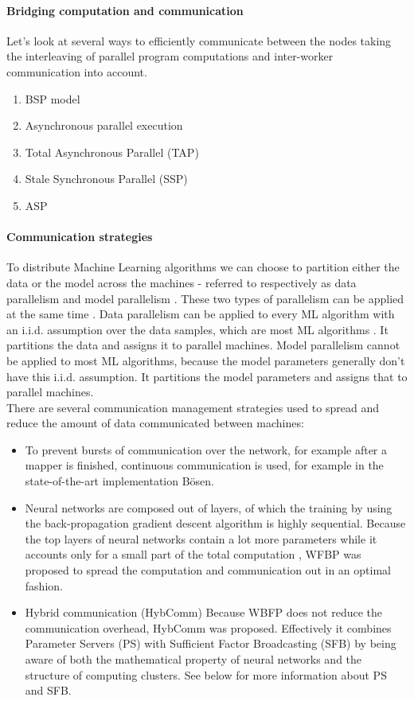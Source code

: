 \paragraph{Bridging computation and communication}
Let's look at several ways to efficiently communicate between the nodes taking the interleaving of parallel program computations and inter-worker communication into account.
\begin{enumerate}
	\item BSP model
	\item Asynchronous parallel execution
	\item Total Asynchronous Parallel (TAP)
	\item Stale Synchronous Parallel (SSP)
	\item ASP
\end{enumerate}


\paragraph{Communication strategies}
To distribute Machine Learning algorithms we can choose to partition either the data or the model across the machines - referred to respectively as data parallelism and model parallelism \cite{Die12}. These two types of parallelism can be applied at the same time \cite{Xing16}. Data parallelism can be applied to every ML algorithm with an i.i.d. assumption over the data samples, which are most ML algorithms \cite{Xing16}. It partitions the data and assigns it to parallel machines. Model parallelism cannot be applied to most ML algorithms, because the model parameters generally don't have this i.i.d. assumption. It partitions the model parameters and assigns that to parallel machines.\\
There are several communication management strategies\cite{Xing16} used to spread and reduce the amount of data communicated between machines:
\begin{itemize}
	\item To prevent bursts of communication over the network, for example after a mapper is finished, continuous communication is used, for example in the state-of-the-art implementation Bösen\cite{Wei15}.
	
	\item Neural networks are composed out of layers, of which the training by using the back-propagation gradient descent algorithm is highly sequential. Because the top layers of neural networks contain a lot more parameters while it accounts only for a small part of the total computation \cite{Xing16}, WFBP \cite{Zhang17} was proposed to spread the computation and communication out in an optimal fashion.
	
	\item Hybrid communication (HybComm) Because WBFP does not reduce the communication overhead, HybComm \cite{Zhang17} was proposed. Effectively it combines Parameter Servers (PS)\cite{Wei15} with Sufficient Factor Broadcasting (SFB)\cite{Xie15} by being aware of both the mathematical property of neural networks and the structure of computing clusters. See below for more information about PS and SFB.
	
\end{itemize}


